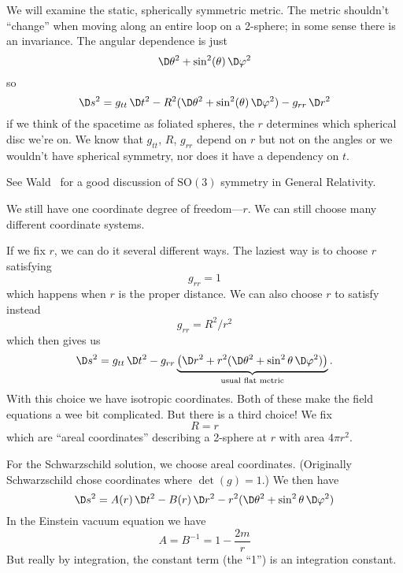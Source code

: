 We will examine the static, spherically symmetric metric. The
metric shouldn't ``change'' when moving along an entire loop on a
2-sphere; in some sense there is an invariance. The angular
dependence is just
\begin{equation*}
\D\theta^{2}+\sin^{2}(\theta)\,\D\varphi^{2}
\end{equation*}
so
\begin{equation}
\D s^{2} = g_{tt}\,\D t^{2} - R^{2}(\D\theta^{2}+\sin^{2}(\theta)\,\D\varphi^{2})
-g_{rr}\,\D r^{2}
\end{equation}
if we think of the spacetime as foliated spheres, the $r$
determines which spherical disc we're on. We know that $g_{tt}$,
$R$, $g_{rr}$ depend on $r$ but not on the angles or we wouldn't
have spherical symmetry, nor does it have a dependency on $t$.
\begin{rmk}
See Wald~\cite{Wald:1984rg} for a good discussion of
$\mathrm{SO}(3)$ symmetry in General Relativity.
\end{rmk}
We still have one coordinate degree of freedom---$r$. We can still
choose many different coordinate systems.

If we fix $r$, we can do it several different ways. The laziest
way is to choose $r$ satisfying
\begin{equation}
g_{rr}=1
\end{equation}
which happens when $r$ is the proper distance. We can also choose
$r$ to satisfy instead
\begin{equation}
g_{rr} = R^{2}/r^{2}
\end{equation}
which then gives us
\begin{equation}
\D s^{2} = g_{tt}\,\D t^{2} - g_{rr}\underbrace{\bigl(\D r^{2} + r^{2}(\D\theta^{2}+\sin^{2}\theta\,\D\varphi^{2})\bigr)}_{\text{usual flat metric}}.
\end{equation}
With this choice we have isotropic coordinates. Both of these
make the field equations a wee bit complicated. But there is a
third choice! We fix
\begin{equation}
R=r
\end{equation}
which are ``areal coordinates'' describing a 2-sphere at $r$ with
area $4\pi r^{2}$.

For the Schwarzschild solution, we choose areal
coordinates. (Originally Schwarzschild chose coordinates where
$\det(g)=1$.) We then have
\begin{equation}
\D s^{2} = A(r)\,\D t^{2}-B(r)\,\D
r^{2}-r^{2}(\D\theta^{2}+\sin^{2}\theta\,\D\varphi^{2})
\end{equation}
In the Einstein vacuum equation we have
\begin{equation}
A = B^{-1} = 1-\frac{2m}{r}
\end{equation}
But really by integration, the constant term (the ``1'') is an
integration constant.

